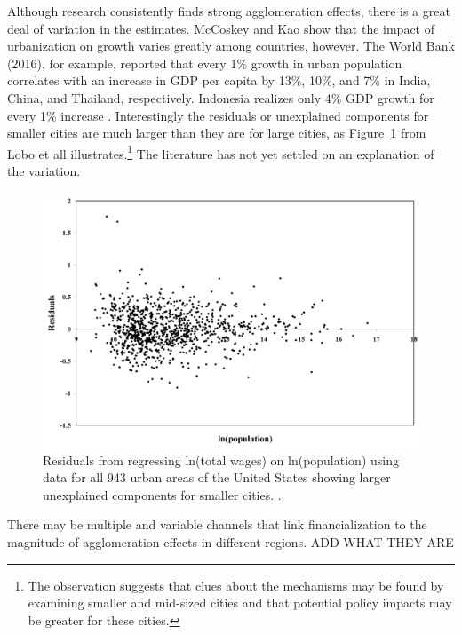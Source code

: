 Although research consistently finds strong agglomeration effects, there is a great deal of variation in the estimates. McCoskey and Kao \cite{mccoskeyPanelDataInvestigation} show that the impact of urbanization on growth varies greatly among countries, however. The World Bank (2016), for example, reported that every 1\% growth in urban population correlates with an increase in GDP per capita by 13\%, 10\%, and 7\% in India, China, and Thailand, respectively. Indonesia realizes only 4\% GDP growth for every 1\% increase \cite{haryantotriRelationshipUrbanizationEducation2021}. Interestingly the residuals or unexplained components for smaller cities are much larger than they are for large cities, as Figure~\ref{fig-residuals-lobo} from Lobo et all \cite{loboUrbanScalingProduction2013} illustrates.\footnote{The observation suggests that clues about the mechanisms may be found by examining smaller and mid-sized cities and that potential policy impacts may be greater for these cities.} The literature has not yet settled on an explanation of the variation.  \cite{loboUrbanScalingProduction2013, pugaMagnitudeCausesAgglomeration2010} 



\begin{figure}[h!tb]
\centering
\includegraphics[scale=0.30]{fig/residuals-lobo.png}
\caption{Residuals from regressing ln(total wages) on ln(population) using data for all 943 urban areas of the United States showing larger unexplained components for smaller cities. \cite{loboUrbanScalingProduction2013}.}
\label{fig-residuals-lobo}
\end{figure}

There may be multiple and variable channels that link financialization to the magnitude of agglomeration effects in different regions.  {\color {red} ADD WHAT THEY ARE} 

